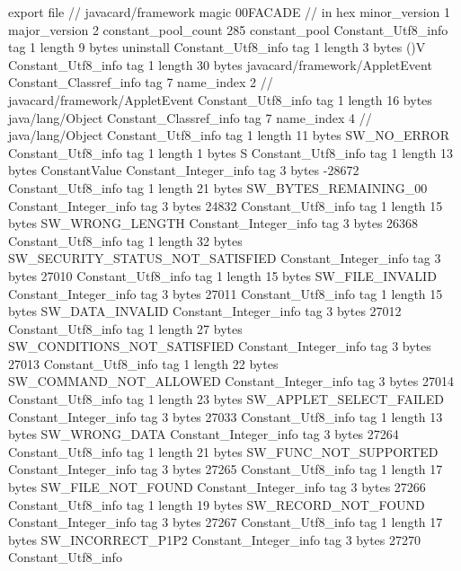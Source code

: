 export file {		// javacard/framework
	magic	00FACADE		 // in hex
	minor_version	1
	major_version	2
	constant_pool_count	285
	constant_pool {
		Constant_Utf8_info {
			tag	1
			length	9
			bytes	uninstall
		}
		Constant_Utf8_info {
			tag	1
			length	3
			bytes	()V
		}
		Constant_Utf8_info {
			tag	1
			length	30
			bytes	javacard/framework/AppletEvent
		}
		Constant_Classref_info {
			tag	7
			name_index	2		// javacard/framework/AppletEvent
		}
		Constant_Utf8_info {
			tag	1
			length	16
			bytes	java/lang/Object
		}
		Constant_Classref_info {
			tag	7
			name_index	4		// java/lang/Object
		}
		Constant_Utf8_info {
			tag	1
			length	11
			bytes	SW_NO_ERROR
		}
		Constant_Utf8_info {
			tag	1
			length	1
			bytes	S
		}
		Constant_Utf8_info {
			tag	1
			length	13
			bytes	ConstantValue
		}
		Constant_Integer_info {
			tag	3
			bytes	-28672
		}
		Constant_Utf8_info {
			tag	1
			length	21
			bytes	SW_BYTES_REMAINING_00
		}
		Constant_Integer_info {
			tag	3
			bytes	24832
		}
		Constant_Utf8_info {
			tag	1
			length	15
			bytes	SW_WRONG_LENGTH
		}
		Constant_Integer_info {
			tag	3
			bytes	26368
		}
		Constant_Utf8_info {
			tag	1
			length	32
			bytes	SW_SECURITY_STATUS_NOT_SATISFIED
		}
		Constant_Integer_info {
			tag	3
			bytes	27010
		}
		Constant_Utf8_info {
			tag	1
			length	15
			bytes	SW_FILE_INVALID
		}
		Constant_Integer_info {
			tag	3
			bytes	27011
		}
		Constant_Utf8_info {
			tag	1
			length	15
			bytes	SW_DATA_INVALID
		}
		Constant_Integer_info {
			tag	3
			bytes	27012
		}
		Constant_Utf8_info {
			tag	1
			length	27
			bytes	SW_CONDITIONS_NOT_SATISFIED
		}
		Constant_Integer_info {
			tag	3
			bytes	27013
		}
		Constant_Utf8_info {
			tag	1
			length	22
			bytes	SW_COMMAND_NOT_ALLOWED
		}
		Constant_Integer_info {
			tag	3
			bytes	27014
		}
		Constant_Utf8_info {
			tag	1
			length	23
			bytes	SW_APPLET_SELECT_FAILED
		}
		Constant_Integer_info {
			tag	3
			bytes	27033
		}
		Constant_Utf8_info {
			tag	1
			length	13
			bytes	SW_WRONG_DATA
		}
		Constant_Integer_info {
			tag	3
			bytes	27264
		}
		Constant_Utf8_info {
			tag	1
			length	21
			bytes	SW_FUNC_NOT_SUPPORTED
		}
		Constant_Integer_info {
			tag	3
			bytes	27265
		}
		Constant_Utf8_info {
			tag	1
			length	17
			bytes	SW_FILE_NOT_FOUND
		}
		Constant_Integer_info {
			tag	3
			bytes	27266
		}
		Constant_Utf8_info {
			tag	1
			length	19
			bytes	SW_RECORD_NOT_FOUND
		}
		Constant_Integer_info {
			tag	3
			bytes	27267
		}
		Constant_Utf8_info {
			tag	1
			length	17
			bytes	SW_INCORRECT_P1P2
		}
		Constant_Integer_info {
			tag	3
			bytes	27270
		}
		Constant_Utf8_info {
}}}
